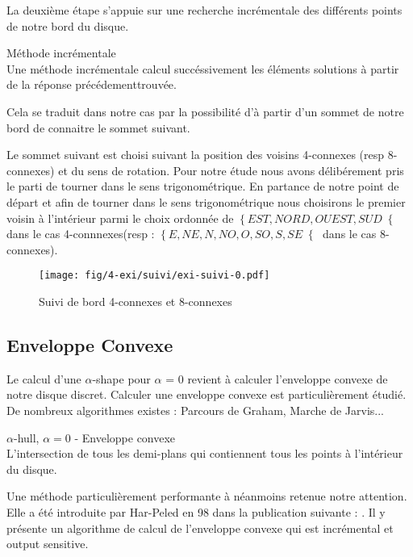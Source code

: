 La deuxième étape s'appuie sur une recherche incrémentale des différents points de notre bord du disque.

\begin{Definition}{Méthode incrémentale}\\
\label{def:os}
      Une méthode incrémentale calcul succéssivement les éléments solutions à partir de la réponse précédementtrouvée.
\end{Definition}
Cela se traduit dans notre cas par la possibilité d'à partir d'un sommet de notre bord de connaitre le sommet suivant.

Le sommet suivant est choisi suivant la position des voisins 4-connexes (resp 8-connexes) et du sens de rotation. Pour notre étude nous avons délibérement pris le parti de tourner dans le sens trigonométrique. En partance de notre point de départ et afin de tourner dans le sens trigonométrique nous choisirons le premier voisin à l'intérieur parmi le choix ordonnée de $\left\{EST, NORD, OUEST, SUD\right\{$ dans le cas 4-connnexes(resp :  $\left\{E, NE, N, NO, O, SO, S, SE\right\{$ dans le cas 8-connexes).

\begin{figure}[h!]
  \centering
  \texttt{[image: fig/4-exi/suivi/exi-suivi-0.pdf]}
  \caption{Suivi de bord 4-connexes et 8-connexes}
\end{figure}
  

\subsection{Enveloppe Convexe}

Le calcul d'une $\alpha$-shape pour $\alpha$ = 0 revient à calculer l'enveloppe convexe de notre disque discret. Calculer une enveloppe convexe est particulièrement étudié. De nombreux algorithmes existes : Parcours de Graham, Marche de Jarvis... 

\begin{Definition}{$\alpha$-hull, $\alpha = 0$ - Enveloppe convexe}\\
\label{def:ch}
      L'intersection de tous les demi-plans qui contiennent tous les points à l’intérieur du disque.
\end{Definition}

Une méthode particulièrement performante à néanmoins retenue notre attention. Elle a été introduite par Har-Peled en 98 dans la publication suivante : \cite{HarPeled98}. Il y présente un algorithme de calcul de l'enveloppe convexe qui est incrémental et output sensitive.


